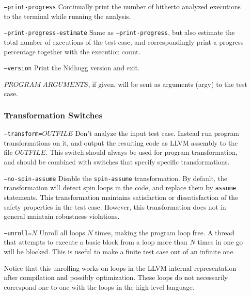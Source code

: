 \documentclass[a4paper]{article}
\begin{document}
\begin{description}
\item{\texttt{--print-progress}}
%
  Continually print the number of hitherto analyzed executions to the
  terminal while running the analysis.
\item{\texttt{--print-progress-estimate}}
%
  Same as \texttt{--print-progress}, but also estimate the total
  number of executions of the test case, and correspondingly print a
  progress percentage together with the execution count.
\item{\texttt{--version}}
%
  Print the Nidhugg version and exit.
\item{$PROGRAM\;ARGUMENTS$}, if given, will be sent as arguments
  (argv) to the test case.
\end{description}

\subsubsection{Transformation Switches}\label{sec:transform:switches}

\begin{description}
\item{\texttt{--transform=$OUTFILE$}}
%
  Don't analyze the input test case. Instead run program
  transformations on it, and output the resulting code as LLVM
  assembly to the file $OUTFILE$. This switch should always be used
  for program transformation, and should be combined with switches
  that specify specific transformations.
\item{\texttt{--no-spin-assume}}
%
  Disable the \texttt{spin-assume} transformation. By default, the
  transformation will detect spin loops in the code, and replace them
  by \texttt{assume} statements. This transformation maintains
  satisfaction or dissatisfaction of the safety properties in the test
  case. However, this transformation does not in general maintain
  robustness violations.
\item{\texttt{--unroll=$N$}}
%
  Unroll all loops $N$ times, making the program loop free. A thread
  that attempts to execute a basic block from a loop more than $N$
  times in one go will be blocked. This is useful to make a finite
  test case out of an infinite one.

  Notice that this unrolling works on loops in the LLVM internal
  representation after compilation and possibly optimization. These
  loops do not necessarily correspond one-to-one with the loops in the
  high-level language.
\end{description}
\end{document}
